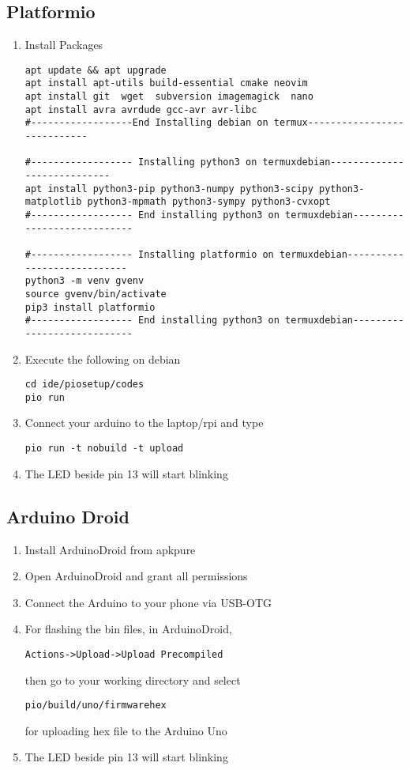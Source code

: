 \subsection{Platformio }
\begin{enumerate}[label=\arabic*.,ref=\theenumi]
	\item Install Packages
\begin{lstlisting}
apt update && apt upgrade
apt install apt-utils build-essential cmake neovim
apt install git  wget  subversion imagemagick  nano  
apt install avra avrdude gcc-avr avr-libc
#------------------End Installing debian on termux----------------------------

#------------------ Installing python3 on termuxdebian----------------------------
apt install python3-pip python3-numpy python3-scipy python3-matplotlib python3-mpmath python3-sympy python3-cvxopt
#------------------ End installing python3 on termuxdebian----------------------------

#------------------ Installing platformio on termuxdebian----------------------------
python3 -m venv gvenv 
source gvenv/bin/activate
pip3 install platformio
#------------------ End installing python3 on termuxdebian----------------------------
\end{lstlisting}
\item Execute the following on debian
\begin{lstlisting}
cd ide/piosetup/codes
pio run
\end{lstlisting}
\item Connect your arduino to the  laptop/rpi and type
\begin{lstlisting}
pio run -t nobuild -t upload
\end{lstlisting}
\item The LED beside pin 13 will start
blinking

\end{enumerate}
\subsection{Arduino Droid}
\begin{enumerate}[label=\arabic*.,ref=\theenumi]
\item Install ArduinoDroid from apkpure
\item Open ArduinoDroid and grant all permissions
\item Connect the Arduino to your phone via USB-OTG
\item For flashing the bin files, in ArduinoDroid,
\begin{lstlisting}
Actions->Upload->Upload Precompiled
\end{lstlisting}
then go to your working directory and select
\begin{lstlisting}
pio/build/uno/firmwarehex
\end{lstlisting}
for uploading hex file to the Arduino Uno
\item The LED beside pin 13 will start
blinking
\end{enumerate}




